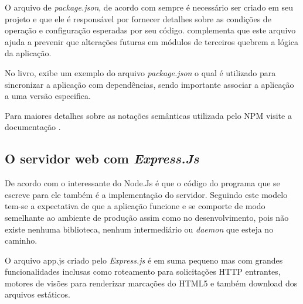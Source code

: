   O arquivo de \textit{package.json}, de acordo com  sempre é necessário ser criado 
  em seu projeto e que ele é responsável por fornecer detalhes sobre as condições de operação e configuração 
  esperadas por seu código. \cite{Wilson:2013} complementa que este arquivo ajuda a prevenir que alterações 
  futuras em módulos de terceiros quebrem a lógica da aplicação.

  No livro, \cite{Wilson:2013} exibe um exemplo do arquivo 
  \textit{package.json} o qual é utilizado para sincronizar a aplicação com dependências, sendo importante associar 
  a aplicação a uma versão especifica. 
  
  Para maiores detalhes sobre as notações semânticas utilizada pelo \ac{NPM} visite a documentação \cite{Semver:2013}.

\subsection{O servidor web com \textit{Express.Js}}
\label{servidor-web-express-js}

  
  De acordo com \cite{Wilson:2013} o interessante do Node.Js é que o código do 
  programa que se escreve para ele também é a implementação do servidor. 
  Seguindo este modelo tem-se a expectativa de que a aplicação funcione e se comporte de modo semelhante 
  ao ambiente de produção assim como no desenvolvimento, pois não existe nenhuma biblioteca, nenhum intermediário 
  ou \textit{daemon} que esteja no caminho.
  
  O arquivo app.js criado pelo \textit{Express.js} é em suma pequeno mas com grandes funcionalidades inclusas como 
  roteamento para solicitações \ac{HTTP} entrantes, motores de visões para renderizar marcações do HTML5
  e também download dos arquivos estáticos.